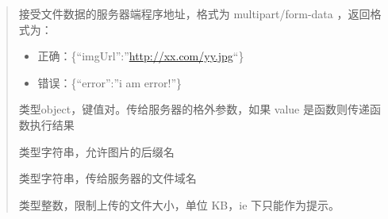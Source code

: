 \documentclass[letterpaper,10pt,english]{sphinxmanual}
\begin{document}
\begin{fulllineitems}
\begin{fulllineitems}
\begin{quote}

\begin{fulllineitems}
\label{relatedproj/editorguide/plugin-config:Editor.pluginConfig.image.upload.serverUrl}
接受文件数据的服务器端程序地址，格式为 multipart/form-data ，返回格式为：
\begin{itemize}
\item {}
正确：\{``imgUrl'':''\href{http://xx.com/yy.jpg}{http://xx.com/yy.jpg}``\}

\item {}
错误：\{``error'':''i am error!''\}

\end{itemize}

\end{fulllineitems}



\begin{fulllineitems}
\label{relatedproj/editorguide/plugin-config:Editor.pluginConfig.image.upload.serverParams}
类型object，键值对。传给服务器的格外参数，如果 value 是函数则传递函数执行结果

\end{fulllineitems}



\begin{fulllineitems}
\label{relatedproj/editorguide/plugin-config:Editor.pluginConfig.image.upload.suffix}
类型字符串，允许图片的后缀名

\end{fulllineitems}



\begin{fulllineitems}
\label{relatedproj/editorguide/plugin-config:Editor.pluginConfig.image.upload.fileInput}
类型字符串，传给服务器的文件域名

\end{fulllineitems}



\begin{fulllineitems}
\label{relatedproj/editorguide/plugin-config:Editor.pluginConfig.image.upload.sizeLimit}
类型整数，限制上传的文件大小，单位 KB，ie 下只能作为提示。


\end{fulllineitems}
\end{quote}
\end{fulllineitems}
\end{fulllineitems}
\end{document}
